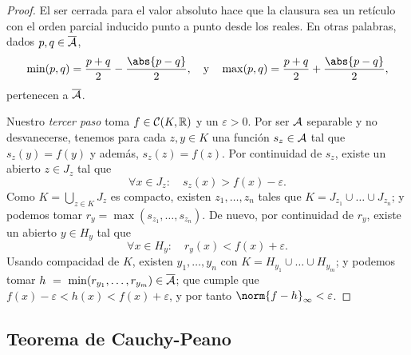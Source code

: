 \documentclass[11pt]{article}
\theoremstyle{plain}
\theoremstyle{definition}
\theoremstyle{remark}
\begin{document}
\begin{proof}
El ser cerrada para el valor absoluto hace que la clausura
sea un retículo con el orden parcial inducido punto a punto
desde los reales. En otras palabras, dados $p,q\in \overline{{\cal A}}$,
\[
\min(p,q) = \frac{p + q}{2} - \frac{\abs{p-q}}{2},\quad\text{y}\quad
\max(p,q) = \frac{p + q}{2} + \frac{\abs{p-q}}{2},
\]
pertenecen a $\overline{\cal A}$.

Nuestro \textit{tercer paso} toma $f \in {\cal C}(K,\mathbb{R})$ y un $\varepsilon > 0$.
Por ser ${\cal A}$ separable y no desvanecerse, tenemos para cada $z,y \in K$ una
función $s_z \in {\cal A}$ tal que $s_{z}(y) = f(y)$ y además, $s_{z}(z) = f(z)$.
Por continuidad de $s_z$, existe un abierto $z \in J_z$ tal que
\[
\forall x \in J_z\colon\quad s_z(x) > f(x) - \varepsilon.
\]
Como $K = \bigcup_{z \in K} J_z$ es compacto, existen $z_1,\dots,z_n$ tales que
$K = J_{z_1} \cup \dots \cup J_{z_n}$; y podemos tomar $r_y = \max(s_{z_1},\dots,s_{z_n})$.
De nuevo, por continuidad de $r_y$, existe un abierto $y \in H_y$
tal que
\[
\forall x \in H_y\colon\quad r_y(x) < f(x) + \varepsilon.
\]
Usando compacidad de $K$, existen $y_1,\dots,y_n$ con $K = H_{y_1} \cup \dots \cup H_{y_m}$;
y podemos tomar $h~=~\min(r_{y_1},\dots,r_{y_m}) \in \overline{{\cal A}}$; que cumple
que $f(x) - \varepsilon < h(x) < f(x) + \varepsilon$, y por tanto $\norm{f - h}_{\infty} < \varepsilon$.

\end{proof}

\subsection{Teorema de Cauchy-Peano}
\end{document}
